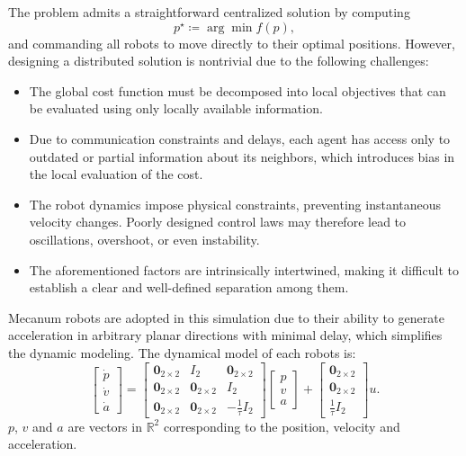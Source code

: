 \begin{rem}
The problem admits a straightforward centralized solution by computing
\[
p^\star \coloneqq \arg \min f(p),
\]
and commanding all robots to move directly to their optimal positions. However, designing a distributed solution is nontrivial due to the following challenges:
\begin{itemize}
    \item The global cost function must be decomposed into local objectives that can be evaluated using only locally available information.
    \item Due to communication constraints and delays, each agent has access only to outdated or partial information about its neighbors, which introduces bias in the local evaluation of the cost.
    \item The robot dynamics impose physical constraints, preventing instantaneous velocity changes. Poorly designed control laws may therefore lead to oscillations, overshoot, or even instability.
    \item The aforementioned factors are intrinsically intertwined, making it difficult to establish a clear and well-defined separation among them.
\end{itemize}
\end{rem}

\begin{rem}
Mecanum robots are adopted in this simulation due to their ability to generate acceleration in arbitrary planar directions with minimal delay, which simplifies the dynamic modeling. The dynamical model of each robots is:
\begin{equation}
\begin{bmatrix}
    \dot{p} \\ \dot{v} \\ \dot{a}
\end{bmatrix}
= 
\begin{bmatrix}
    \mathbf{0}_{2\times 2} & I_2 & \mathbf{0}_{2\times 2}   \\
    \mathbf{0}_{2\times 2} & \mathbf{0}_{2\times 2} & I_2 \\
    \mathbf{0}_{2\times 2} & \mathbf{0}_{2\times 2} & -\frac{1}{\tau}I_2
\end{bmatrix}
\begin{bmatrix}
    p \\ v \\ a
\end{bmatrix}
+ \begin{bmatrix}
    \mathbf{0}_{2\times 2} \\ \mathbf{0}_{2\times 2} \\ \frac{1}{\tau}I_2
\end{bmatrix} u.
\end{equation}
\(p\), \(v\) and \(a\) are vectors in \(\mathbb{R}^2\) corresponding to the position, velocity and acceleration.
\end{rem}


